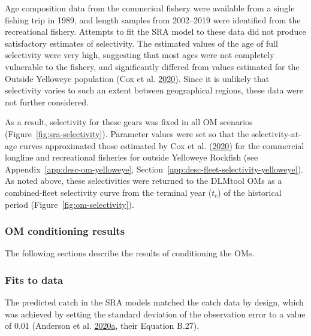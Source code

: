 \documentclass[11pt]{book}
\begin{document}
Age composition data from the commerical fishery were available from a single fishing trip in 1989, and length samples from 2002--2019 were identified from the recreational fishery. Attempts to fit the SRA model to these data did not produce satisfactory estimates of selectivity. The estimated values of the age of full selectivity were very high, suggesting that most ages were not completely vulnerable to the fishery, and significantly differed from values estimated for the Outside Yelloweye population (Cox et al. \protect\hyperlink{ref-cox2020}{2020}). Since it is unlikely that selectivity varies to such an extent between geographical regions, these data were not further considered.

As a result, selectivity for these gears was fixed in all OM scenarios (Figure~\ref{fig:sra-selectivity}). Parameter values were set so that the selectivity-at-age curves approximated those estimated by Cox et al. (\protect\hyperlink{ref-cox2020}{2020}) for the commercial longline and recreational fisheries for outside Yelloweye Rockfish (see Appendix~\ref{app:desc-om-yelloweye}, Section~\ref{app:desc-fleet-selectivity-yelloweye}). As noted above, these selectivities were returned to the DLMtool OMs as a combined-fleet selectivity curve from the terminal year (\(t_c\)) of the historical period (Figure~\ref{fig:om-selectivity}).

\hypertarget{sec:approach3-conditioning-results}{%
\subsubsection{OM conditioning results}\label{sec:approach3-conditioning-results}}

The following sections describe the results of conditioning the OMs.

\hypertarget{sec:approach3-conditioning-indices}{%
\subsubsection{Fits to data}\label{sec:approach3-conditioning-indices}}

The predicted catch in the SRA models matched the catch data by design, which was achieved by setting the standard deviation of the observation error to a value of 0.01 (Anderson et al. \protect\hyperlink{ref-anderson2020gfmp}{2020}\protect\hyperlink{ref-anderson2020gfmp}{a}, their Equation B.27).
\end{document}
